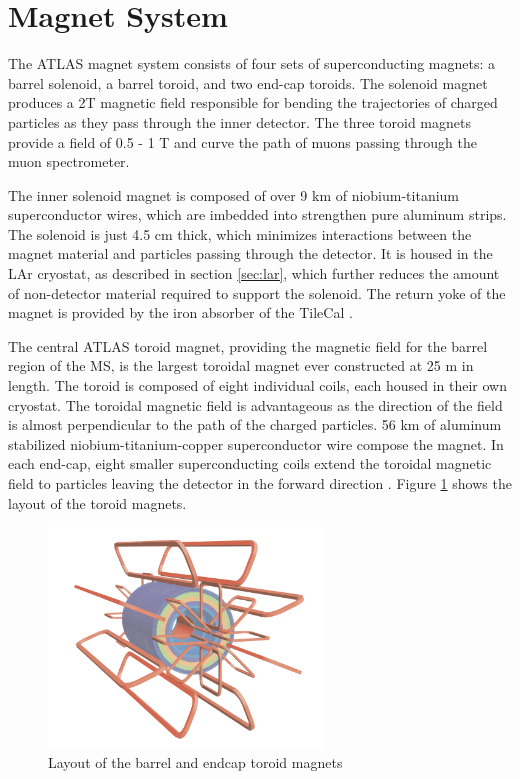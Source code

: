 \section{Magnet System}
\label{sec:magnets}
The ATLAS magnet system consists of four sets of superconducting magnets: a barrel solenoid, a barrel toroid, and two end-cap toroids. The solenoid magnet produces a 2T magnetic field responsible for bending the trajectories of charged particles as they pass through the inner detector. The three toroid magnets provide a field of 0.5 - 1 T and curve the path of muons passing through the muon spectrometer.\par

The inner solenoid magnet is composed of over 9 km of niobium-titanium superconductor wires, which are imbedded into strengthen pure aluminum strips. The solenoid is just 4.5 cm thick, which minimizes interactions between the magnet material and particles passing through the detector. It is housed in the LAr cryostat, as described in section \ref{sec:lar}, which further reduces the amount of non-detector material required to support the solenoid. The return yoke of the magnet is provided by the iron absorber of the TileCal \cite{magnet_tdr}.\par

The central ATLAS toroid magnet, providing the magnetic field for the barrel region of the MS, is the largest toroidal magnet ever constructed at 25 m in length. The toroid is composed of eight individual coils, each housed in their own cryostat. The toroidal magnetic field is advantageous as the direction of the field is almost perpendicular to the path of the charged particles. 56 km of aluminum stabilized niobium-titanium-copper superconductor wire compose the magnet. In each end-cap, eight smaller superconducting coils extend the toroidal magnetic field to particles leaving the detector in the forward direction \cite{magnet_tdr}. Figure \ref{fig:magnets} shows the layout of the toroid magnets.

\begin{figure}
        \centering
	\includegraphics[width=0.65\textwidth]{figures/ch4/magnets.png}
	\caption{Layout of the barrel and endcap toroid magnets \cite{atlas_overview} }
	\label{fig:magnets}
\end{figure}

